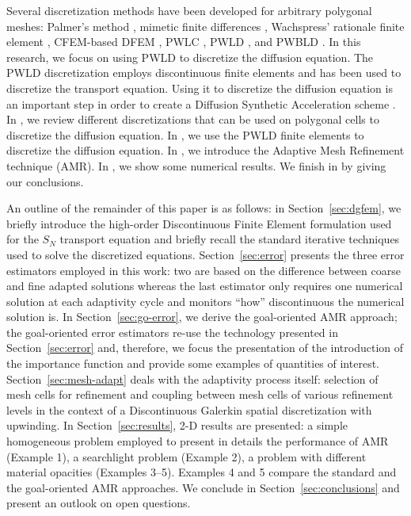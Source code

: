 \documentclass[preprint,10pt]{elsarticle}
\renewcommand{\(}{\left(}
\renewcommand{\)}{\right)}
\renewcommand{\[}{\left[}
\renewcommand{\]}{\right]}
\begin{document}
Several discretization methods have been developed for arbitrary polygonal
meshes: Palmer's method \cite{Palmer2001}, mimetic finite differences
\cite{Lipnikov2004,Hyman2002,Kuznetsov2004,Brezzi2005},
Wachspress' rationale finite element \cite{Wachspress1975},
CFEM-based DFEM \cite{Warsa2008}, PWLC \cite{Bailey2008a}, PWLD 
\cite{Stone2003,Bailey2008,Bailey2008a}, and PWBLD \cite{Bailey2011}. In this
research, we focus on using PWLD to discretize the diffusion equation. The
PWLD discretization employs discontinuous finite elements and has been used to
discretize the transport equation. Using it to discretize the diffusion
equation is an important step in order to create a Diffusion Synthetic
Acceleration scheme \cite{Adams2002,Wang2010}.
In , we review different discretizations that can be used on
polygonal cells to discretize the diffusion equation. In , we
use the PWLD finite elements to discretize the diffusion
equation. In , we introduce the Adaptive Mesh Refinement
technique (AMR). In , we show some numerical results. We finish
in  by giving our conclusions.







An outline of the remainder of this paper is as follows: in Section~\ref{sec:dgfem}, 
we briefly introduce the  high-order Discontinuous Finite Element formulation used for
the  $S_{N}$ transport equation and briefly recall the standard iterative techniques used to
solve the discretized equations. 
%
Section~\ref{sec:error} presents the three error estimators employed in this work: two are based on the
difference between coarse and fine adapted solutions whereas the last estimator only requires one numerical solution at each adaptivity cycle and monitors ``how'' discontinuous the numerical solution is. 
%
In Section~\ref{sec:go-error}, we derive the goal-oriented AMR approach; the goal-oriented error estimators re-use the technology presented in Section~\ref{sec:error} and, therefore, we focus the presentation of the introduction of the importance function and provide some examples of quantities of interest.
%
Section~\ref{sec:mesh-adapt} deals with the adaptivity process itself: selection of mesh cells 
for refinement and coupling between mesh cells of various refinement levels in the context of 
a Discontinuous Galerkin spatial discretization with upwinding. 
%
In Section~\ref{sec:results}, 2-D results are presented: a simple homogeneous problem employed to present in details the performance of AMR (Example 1), a searchlight problem (Example 2), a problem with different material opacities (Examples 3--5). Examples 4 and 5 compare the standard and the goal-oriented AMR approaches.
%
We conclude in Section~\ref{sec:conclusions} and present an outlook on open questions.
\end{document}
